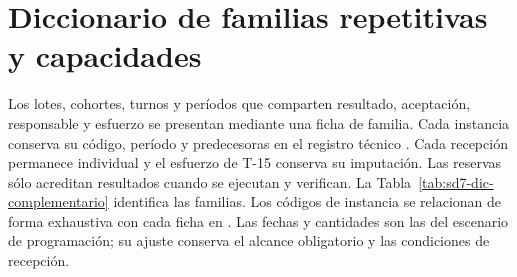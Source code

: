 \section{Diccionario de familias repetitivas y capacidades}
Los lotes, cohortes, turnos y períodos que comparten resultado, aceptación, responsable y esfuerzo se presentan mediante una ficha de familia. Cada instancia conserva su código, período y predecesoras en el registro técnico . Cada recepción permanece individual y el esfuerzo de T-15 conserva su imputación. Las reservas sólo acreditan resultados cuando se ejecutan y verifican.
La Tabla~\ref{tab:sd7-dic-complementario} identifica las familias. Los códigos de instancia se relacionan de forma exhaustiva con cada ficha en . Las fechas y cantidades son las del escenario de programación; su ajuste conserva el alcance obligatorio y las condiciones de recepción.
\begingroup\small\setlength{\tabcolsep}{3pt}

